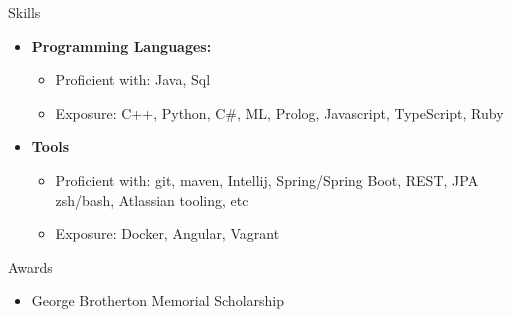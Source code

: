 \documentclass[11pt,oneside]{article}
\newenvironment{ressection}[1]{
	\vspace{4pt}
	{\fontfamily{phv}\selectfont\Large#1}
	\begin{itemize}
	\vspace{3pt}
}{
	\end{itemize}
}
\newcommand{\resitem}[1]{
	\vspace{-4pt}
	\item \begin{flushleft} #1 \end{flushleft}
}
\newcommand{\ressubitem}[1]{
	\vspace{-1pt}
	\item \begin{flushleft} #1 \end{flushleft}
}
\newenvironment{reslist}[1]{
	\resitem{\textbf{#1}}
	\vspace{-5pt}
	\begin{itemize}
}{
	\end{itemize}
}
\begin{document}
\begin{ressection}{Skills}
\begin{reslist}{Programming Languages:}
  \ressubitem{Proficient with: Java, Sql} 
  \ressubitem{Exposure: C++, Python, C\#, ML, Prolog, Javascript, TypeScript, Ruby}
\end{reslist}
\begin{reslist}{Tools}
	\ressubitem{Proficient with: git, maven, Intellij, Spring/Spring Boot, REST, JPA zsh/bash, Atlassian tooling, etc}
	\ressubitem{Exposure: Docker, Angular, Vagrant }
\end{reslist}
\end{ressection}

\begin{ressection}{Awards}
  \resitem{George Brotherton Memorial Scholarship}
\end{ressection}
\end{document}
